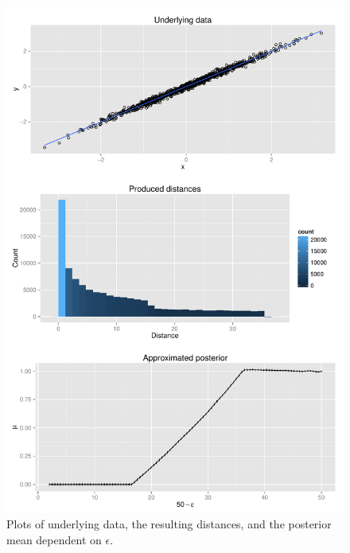 \documentclass[a4paper,man, natbib]{apa6}
\begin{document}
\begin{figure}[htb!]
  \caption{Plots of underlying data, the resulting distances, and the posterior mean dependent on $\epsilon$.}
\label{fig:linexample}
  \centering
    \includegraphics[scale=0.7]{figs/linexample.pdf}
\end{figure}

\end{document}
